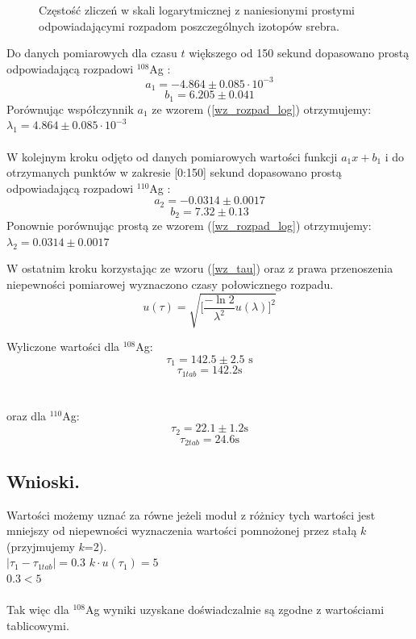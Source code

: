 \documentclass{article}
\begin{document}
\begin{figure}[h!]
	\fontsize{6}{8}\selectfont %
	\centering
	\resizebox{1.0\textwidth}{!}{}	
	
	\caption{Częstość zliczeń w skali logarytmicznej z naniesionymi prostymi odpowiadającymi rozpadom poszczególnych izotopów srebra.}
	\label{wykres_zliczenia_czas}
\end{figure}

Do danych pomiarowych dla czasu $t$ większego od 150 sekund dopasowano prostą odpowiadającą rozpadowi $^{108}$Ag : \\
\[a_1 = -4.864 \pm 0.085 \cdot 10^{-3}
\]
\[	b_1 = 6.205 \pm 0.041
\]
Porównując współczynnik $a_1$ ze wzorem (\ref{wz_rozpad_log}) otrzymujemy:\\
$\lambda _1 =  4.864 \pm 0.085 \cdot 10^{-3}$\\\\

W kolejnym kroku odjęto od danych pomiarowych wartości funkcji $a_1 x + b_1$ i do otrzymanych punktów w zakresie [0:150] sekund dopasowano prostą odpowiadającą rozpadowi $^{110}$Ag :
\[a_2 = -0.0314 \pm 0.0017
\]
\[b_2 = 7.32 \pm 0.13
\]
Ponownie porównując prostą ze wzorem (\ref{wz_rozpad_log}) otrzymujemy:\\
$\lambda _2 = 0.0314 \pm 0.0017$

W ostatnim kroku korzystając ze wzoru (\ref{wz_tau}) oraz z prawa przenoszenia niepewności pomiarowej wyznaczono czasy połowicznego rozpadu.
\begin{equation}
u(\tau) = \sqrt{ \Big[ \frac{-\ln 2}{\lambda ^2}u(\lambda) \Big]^2 }
\label{wz_niepewnosc}
\end{equation}

\noindent
Wyliczone wartości dla $^{108}$Ag:\\
\[\tau _1 = 142.5 \pm 2.5\text{ s}
\]
\[\tau _{1tab} = 142.2 \text{s}
\]
\\\\
oraz dla $^{110}$Ag:\\
\[\tau _2 = 22.1 \pm 1.2 \text{s}
\]
\[\tau _{2tab} = 24.6 \text{s}
\]


\subsection{Wnioski.}
Wartości możemy uznać za równe jeżeli moduł z różnicy tych wartości jest mniejszy od niepewności wyznaczenia wartości pomnożonej przez stałą $k$ (przyjmujemy $k$=2). \\
$|\tau _1 -\tau _{1tab}| = 0.3$  $k\cdot u(\tau _1)=  5$ \\
$0.3 < 5$\\\\
Tak więc dla $^{108}$Ag wyniki uzyskane doświadczalnie są zgodne z wartościami tablicowymi.\\\\
\end{document}
